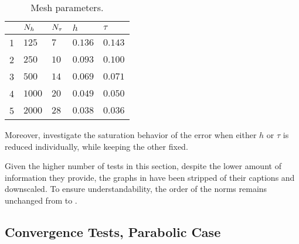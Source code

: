 \begin{table}[!ht]
    \centering
    \def\arraystretch{1.25}
    \begin{tabular}{ | C{1cm} || C{2cm} | C{2cm} | C{2cm} | C{2cm} | }
        \hline
         & $N_h$ & $N_{\tau}$ & $h$ & $\tau$ \\
        \hline
         & $125$ & $7$ & $\num{0.136}$ & $\num{0.143}$ \\
        2 & $250$ & $10$ & $\num{0.093}$ & $\num{0.100}$ \\
        3 & $500$ & $14$ & $\num{0.069}$ & $\num{0.071}$ \\
        4 & $1000$ & $20$ & $\num{0.049}$ & $\num{0.050}$ \\
        5 & $2000$ & $28$ & $\num{0.038}$ & $\num{0.036}$ \\
        \hline
    \end{tabular}
    \caption{Mesh parameters.}
    \label{table:ht}
\end{table}

Moreover,  investigate the saturation behavior of the error when either $h$ or $\tau$ is reduced individually, while keeping the other fixed.

Given the higher number of tests in this section, despite the lower amount of information they provide, the graphs in  have been stripped of their captions and downscaled. To ensure understandability, the order of the norms remains unchanged from  to .

\newpage
\subsection{Convergence Tests, Parabolic Case} \label{sec:graphs_1}



